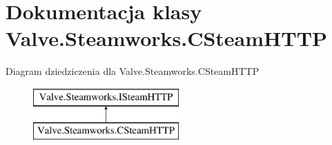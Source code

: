 \hypertarget{class_valve_1_1_steamworks_1_1_c_steam_h_t_t_p}{}\section{Dokumentacja klasy Valve.\+Steamworks.\+C\+Steam\+H\+T\+TP}
\label{class_valve_1_1_steamworks_1_1_c_steam_h_t_t_p}
Diagram dziedziczenia dla Valve.\+Steamworks.\+C\+Steam\+H\+T\+TP\begin{figure}[H]
\begin{center}
\leavevmode
\includegraphics[height=2.000000cm]{class_valve_1_1_steamworks_1_1_c_steam_h_t_t_p}
\end{center}
\end{figure}

